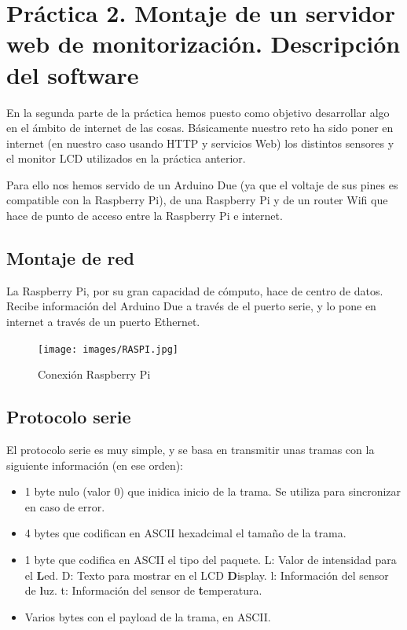 \documentclass[]{article}
\begin{document}
\section{Práctica 2. Montaje de un servidor web de monitorización. Descripción del software}

En la segunda parte de la práctica hemos puesto como objetivo desarrollar algo en el ámbito de internet de las cosas. Básicamente nuestro reto ha sido poner en internet (en nuestro caso usando HTTP y servicios Web) los distintos sensores y el monitor LCD utilizados en la práctica anterior.

Para ello nos hemos servido de un Arduino Due (ya que el voltaje de sus pines es compatible con la Raspberry Pi), de una Raspberry Pi y de un router Wifi que hace de punto de acceso entre la Raspberry Pi e internet.

\subsection{Montaje de red}

La Raspberry Pi, por su gran capacidad de cómputo, hace de centro de datos. Recibe información del Arduino Due a través de el puerto serie, y lo pone en internet a través de un puerto Ethernet. 

\begin{figure}[H]

\end{figure}

\begin{figure}[H]
	\centering
	\texttt{[image: images/RASPI.jpg]}
	\caption{Conexión Raspberry Pi}
	\label{fig:raspi}
\end{figure}

\subsection{Protocolo serie}

El protocolo serie es muy simple, y se basa en transmitir unas tramas con la siguiente información (en ese orden):

\begin{itemize}
	\item 1 byte nulo (valor 0) que inidica inicio de la trama. Se utiliza para sincronizar en caso de error.
	\item 4 bytes que codifican en ASCII hexadcimal el tamaño de la trama.
	\item 1 byte que codifica en ASCII el tipo del paquete.
		\subitem L: Valor de intensidad para el \textbf{L}ed.
		\subitem D: Texto para mostrar en el LCD \textbf{D}isplay.
		\subitem l: Información del sensor de \textbf{l}uz.
		\subitem t: Información del sensor de \textbf{t}emperatura.
	\item Varios bytes con el payload de la trama, en ASCII.
\end{itemize}
\end{document}
